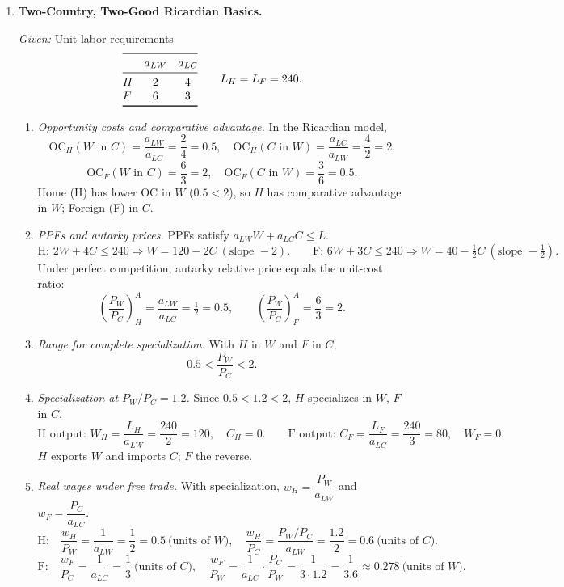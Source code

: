 \documentclass[11pt]{article}
\begin{document}
\begin{enumerate}[leftmargin=*, resume]
\item \textbf{Two-Country, Two-Good Ricardian Basics.}

\emph{Given:} Unit labor requirements
\[
\begin{array}{@{}lcc@{}}
\toprule
 & a_{LW} & a_{LC}\\
\midrule
H & 2 & 4\\
F & 6 & 3\\
\bottomrule
\end{array}
\qquad L_H=L_F=240.
\]

\begin{enumerate}
\item \emph{Opportunity costs and comparative advantage.} In the Ricardian model,
\[
\text{OC}_H(W \text{ in } C)=\frac{a_{LW}}{a_{LC}}=\frac{2}{4}=0.5,\quad
\text{OC}_H(C \text{ in } W)=\frac{a_{LC}}{a_{LW}}=\frac{4}{2}=2.
\]
\[
\text{OC}_F(W \text{ in } C)=\frac{6}{3}=2,\quad
\text{OC}_F(C \text{ in } W)=\frac{3}{6}=0.5.
\]
Home (H) has lower OC in $W$ ($0.5<2$), so $H$ has comparative advantage in $W$; Foreign (F) in $C$.

\item \emph{PPFs and autarky prices.} PPFs satisfy $a_{LW}W+a_{LC}C\le L$.
\[
\text{H: } 2W+4C\le 240 \Rightarrow W=120-2C\ (\text{slope }-2).
\qquad
\text{F: } 6W+3C\le 240 \Rightarrow W=40-\tfrac{1}{2}C\ (\text{slope }-\tfrac{1}{2}).
\]
Under perfect competition, autarky relative price equals the unit-cost ratio:
\[
\left(\frac{P_W}{P_C}\right)^{A}_H=\frac{a_{LW}}{a_{LC}}=\tfrac{1}{2}=0.5,
\qquad
\left(\frac{P_W}{P_C}\right)^{A}_F=\frac{6}{3}=2.
\]

\item \emph{Range for complete specialization.} With $H$ in $W$ and $F$ in $C$,
\[
0.5 < \frac{P_W}{P_C} < 2.
\]

\item \emph{Specialization at $P_W/P_C=1.2$.} Since $0.5<1.2<2$, $H$ specializes in $W$, $F$ in $C$.
\[
\text{H output: } W_H=\frac{L_H}{a_{LW}}=\frac{240}{2}=120,\quad C_H=0.
\qquad
\text{F output: } C_F=\frac{L_F}{a_{LC}}=\frac{240}{3}=80,\quad W_F=0.
\]
$H$ exports $W$ and imports $C$; $F$ the reverse.

\item \emph{Real wages under free trade.} With specialization, $w_H=\dfrac{P_W}{a_{LW}}$ and $w_F=\dfrac{P_C}{a_{LC}}$.
\[
\text{H:}\quad \frac{w_H}{P_W}=\frac{1}{a_{LW}}=\frac{1}{2}=0.5\ \text{(units of $W$)},\quad
\frac{w_H}{P_C}=\frac{P_W/P_C}{a_{LW}}=\frac{1.2}{2}=0.6\ \text{(units of $C$)}.
\]
\[
\text{F:}\quad \frac{w_F}{P_C}=\frac{1}{a_{LC}}=\frac{1}{3}\ \text{(units of $C$)},\quad
\frac{w_F}{P_W}=\frac{1}{a_{LC}}\cdot\frac{P_C}{P_W}=\frac{1}{3\cdot 1.2}=\frac{1}{3.6}\approx 0.278\ \text{(units of $W$)}.
\]
\end{enumerate}


\end{enumerate}
\end{document}
